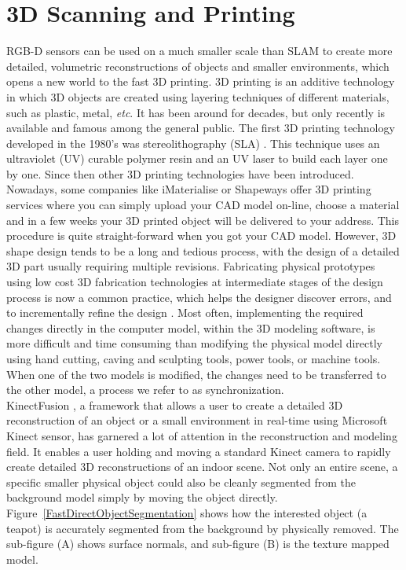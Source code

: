 \section{3D Scanning and Printing}
RGB-D sensors can be used on a much smaller scale than SLAM to create more detailed, volumetric reconstructions of objects and smaller environments, which opens a new world to the fast 3D printing. 3D printing is an additive technology in which 3D objects are created using layering techniques of different materials, such as plastic, metal, \textit{etc}.  It has been around for decades, but only recently is available and famous among the general public. The first 3D printing technology developed in the 1980's was stereolithography (SLA) \cite{Patent3Dprinting86}. This technique uses an ultraviolet (UV) curable polymer resin and an UV laser to build each layer one by one. Since then other 3D printing technologies have been introduced. Nowadays, some companies like iMaterialise or Shapeways offer 3D printing services where you can simply upload your CAD model on-line, choose a material and in a few weeks your 3D printed object will be delivered to your address. This procedure is quite straight-forward when you got your CAD model. However, 3D shape design tends to be a long and tedious process, with the design of a detailed 3D part usually requiring multiple revisions. Fabricating physical prototypes using low cost 3D fabrication technologies at intermediate stages of the design process is now a common practice, which helps the designer discover errors, and to incrementally refine the design \cite{3DModelingForPrinting15}. Most often, implementing the required changes directly in the computer model, within the 3D modeling software, is more difficult and time consuming than modifying the physical model directly using hand cutting, caving and sculpting tools, power tools, or machine tools. When one of the two models is modified, the changes need to be transferred to the other model, a process we refer to as synchronization. 
\\\indent
KinectFusion \cite{KinectFusionIzadi_2011}, a framework that allows a user to create a detailed 3D reconstruction of an object or a small environment in real-time using Microsoft Kinect sensor, has garnered a lot of attention in the reconstruction and modeling field. It enables a user holding and moving a standard Kinect camera to rapidly create detailed 3D reconstructions of an indoor scene. Not only an entire scene, a specific smaller physical object could also be cleanly segmented from the background model simply by moving the object directly. Figure~\ref{FastDirectObjectSegmentation} shows how the interested object (a teapot) is accurately segmented from the background by physically removed. The sub-figure (A) shows surface normals, and sub-figure (B) is the texture mapped model. %
